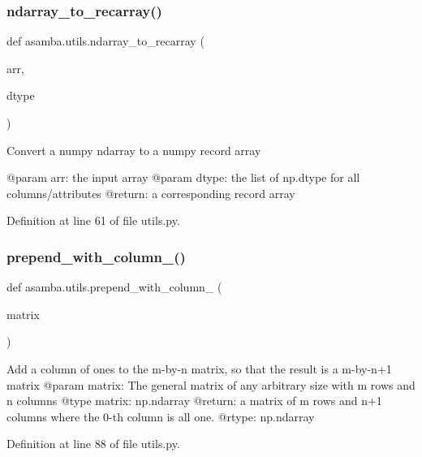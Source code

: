 \subsubsection{\texorpdfstring{ndarray\+\_\+to\+\_\+recarray()}{ndarray\_to\_recarray()}}
{\footnotesize\ttfamily def asamba.\+utils.\+ndarray\+\_\+to\+\_\+recarray (\begin{DoxyParamCaption}\item[{}]{arr,  }\item[{}]{dtype }\end{DoxyParamCaption})}

\begin{DoxyVerb}Convert a numpy ndarray to a numpy record array

@param arr: the input array
@param dtype: the list of np.dtype for all columns/attributes
@return: a corresponding record array
\end{DoxyVerb}
 

Definition at line 61 of file utils.\+py.

\mbox{\label{namespaceasamba_1_1utils_a304af08913aaa7042678dc3f0b80a149}} 
\subsubsection{\texorpdfstring{prepend\+\_\+with\+\_\+column\+\_()}{prepend\_with\_column\_1()}}
{\footnotesize\ttfamily def asamba.\+utils.\+prepend\+\_\+with\+\_\+column\+\_ (\begin{DoxyParamCaption}\item[{}]{matrix }\end{DoxyParamCaption})}

\begin{DoxyVerb}Add a column of ones to the m-by-n matrix, so that the result is a m-by-n+1 matrix
@param matrix: The general matrix of any arbitrary size with m rows and n columns
@type matrix: np.ndarray
@return: a matrix of m rows and n+1 columns where the 0-th column is all one.
@rtype: np.ndarray
\end{DoxyVerb}
 

Definition at line 88 of file utils.\+py.

\mbox{\label{namespaceasamba_1_1utils_a1cb8e79c01ffa1dbbd8dec58aa531ae7}} 
